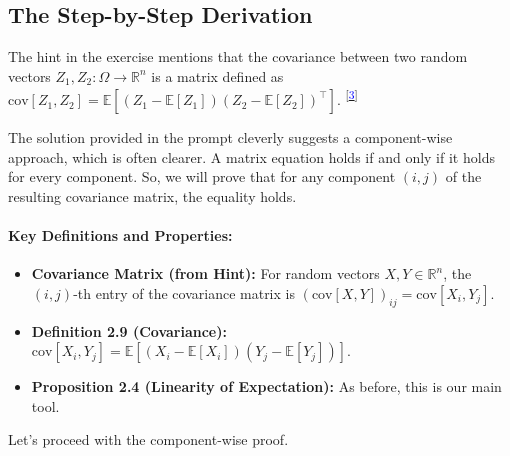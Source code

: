\documentclass[11pt,a4paper]{article}
\newcommand{\noteLink}[1]{\textsuperscript{[\hyperlink{#1}{\textcolor{blue}{#1}}]}}
\begin{document}
\subsection{The Step-by-Step Derivation}
The hint in the exercise mentions that the covariance between two random vectors $Z_1, Z_2: \Omega \to \mathbb{R}^n$ is a matrix defined as $\text{cov}[Z_1, Z_2] = \mathbb{E}[(Z_1 - \mathbb{E}[Z_1])(Z_2 - \mathbb{E}[Z_2])^\top]$. \noteLink{3}

The solution provided in the prompt cleverly suggests a component-wise approach, which is often clearer. A matrix equation holds if and only if it holds for every component. So, we will prove that for any component $(i,j)$ of the resulting covariance matrix, the equality holds.

\paragraph{Key Definitions and Properties:}
\begin{itemize}
    \item \textbf{Covariance Matrix (from Hint):} For random vectors $X, Y \in \mathbb{R}^n$, the $(i,j)$-th entry of the covariance matrix is $(\text{cov}[X,Y])_{ij} = \text{cov}[X_i, Y_j]$.
    \item \textbf{Definition 2.9 (Covariance):} $\text{cov}[X_i, Y_j] = \mathbb{E}[(X_i - \mathbb{E}[X_i])(Y_j - \mathbb{E}[Y_j])]$.
    \item \textbf{Proposition 2.4 (Linearity of Expectation):} As before, this is our main tool.
\end{itemize}

Let's proceed with the component-wise proof.
\end{document}
